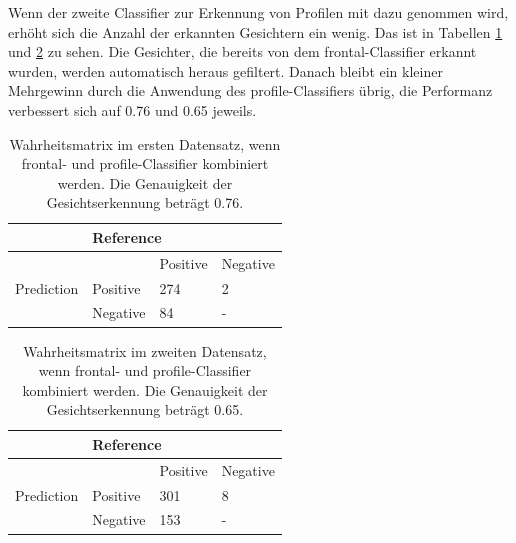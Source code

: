 Wenn der zweite Classifier zur Erkennung von Profilen mit dazu genommen wird, erhöht sich die Anzahl der erkannten Gesichtern ein wenig. Das ist in Tabellen \ref{tab:set1frontalprofile} und \ref{tab:set2frontalprofile} zu sehen. Die Gesichter, die bereits von dem frontal-Classifier erkannt wurden, werden automatisch heraus gefiltert. Danach bleibt ein kleiner Mehrgewinn durch die Anwendung des profile-Classifiers übrig, die Performanz verbessert sich auf 0.76 und 0.65 jeweils.
\begin{table}[h]
	\centering
	\begin{tabular}{llll}
		\hline
		& \multicolumn{3}{l}{Reference} \\ \hline
		\multirow{3}{*}{Prediction} &  & Positive & Negative \\
		& Positive & 274 & 2 \\
		& Negative & 84 & - \\ \cline{2-4} 
	\end{tabular}
	\caption{Wahrheitsmatrix im ersten Datensatz, wenn frontal- und profile-Classifier kombiniert werden. Die Genauigkeit der Gesichtserkennung beträgt 0.76.}
	\label{tab:set1frontalprofile}
\end{table}
\begin{table}[h]
	\centering
	\begin{tabular}{llll}
		\hline
		& \multicolumn{3}{l}{Reference} \\ \hline
		\multirow{3}{*}{Prediction} &  & Positive & Negative \\
		& Positive & 301 & 8 \\
		& Negative & 153 & - \\ \cline{2-4} 
	\end{tabular}
	\caption{Wahrheitsmatrix im zweiten Datensatz, wenn frontal- und profile-Classifier kombiniert werden. Die Genauigkeit der Gesichtserkennung beträgt 0.65.}
	\label{tab:set2frontalprofile}
\end{table}

